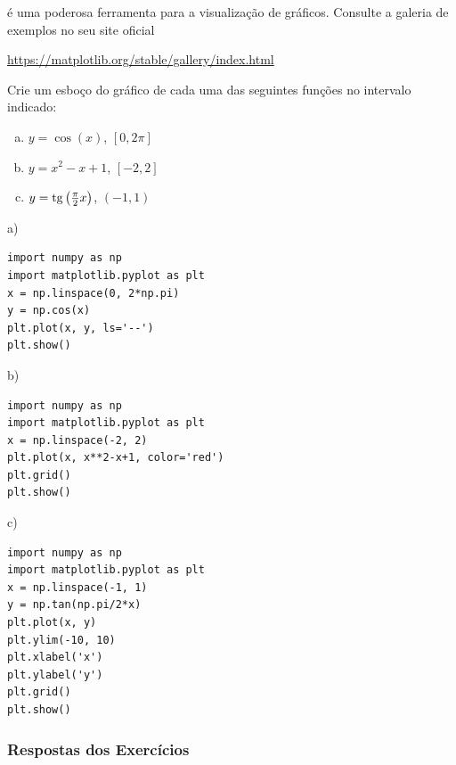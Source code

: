\begin{obs}
  {\PYTHONmatplotlib} é uma poderosa ferramenta para a visualização de gráficos. Consulte a galeria de exemplos no seu site oficial
  \begin{center}
    \url{https://matplotlib.org/stable/gallery/index.html}
  \end{center}
\end{obs}

\begin{exer}
  Crie um esboço do gráfico de cada uma das seguintes funções no intervalo indicado:
  \begin{enumerate}[a)]
  \item $y = \cos(x)$, $\left[0, 2\pi\right]$
  \item $y = x^2 - x + 1$, $[-2, 2]$
  \item $y = \operatorname{tg}\left(\frac{\pi}{2}x\right)$, $(-1, 1)$
  \end{enumerate}
\end{exer}
\begin{resp}

a)

\begin{lstlisting}
import numpy as np
import matplotlib.pyplot as plt
x = np.linspace(0, 2*np.pi)
y = np.cos(x)
plt.plot(x, y, ls='--')
plt.show()
\end{lstlisting}

b)

\begin{lstlisting}
import numpy as np
import matplotlib.pyplot as plt
x = np.linspace(-2, 2)
plt.plot(x, x**2-x+1, color='red')
plt.grid()
plt.show()
\end{lstlisting}

c)

\begin{lstlisting}
import numpy as np
import matplotlib.pyplot as plt
x = np.linspace(-1, 1)
y = np.tan(np.pi/2*x)
plt.plot(x, y)
plt.ylim(-10, 10)
plt.xlabel('x')
plt.ylabel('y')
plt.grid()
plt.show()
\end{lstlisting}

\end{resp}

\ifisbook 
\subsubsection*{Respostas dos Exercícios}
\shipoutAnswer
\fi

